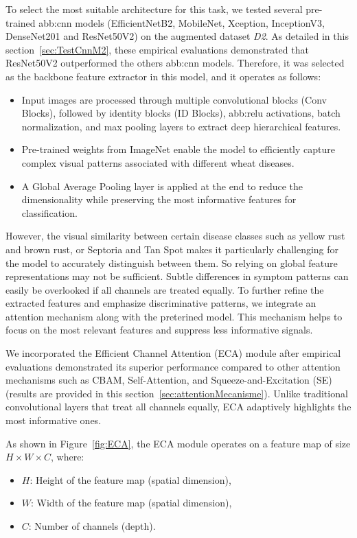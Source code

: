 To select the most suitable architecture for this task, we tested several pre-trained \gls{abb:cnn} models (EfficientNetB2, MobileNet, Xception, InceptionV3, DenseNet201 and ResNet50V2) on the augmented dataset \textit{D2}. As detailed in this section~\ref{sec:TestCnnM2}, these empirical evaluations demonstrated that ResNet50V2 outperformed the others \gls{abb:cnn} models. Therefore, it was selected as the backbone feature extractor in this model, and it operates as follows:
\begin{itemize}
    \item Input images are processed through multiple convolutional blocks (Conv Blocks), followed by identity blocks (ID Blocks), \gls{abb:relu} activations, batch normalization, and max pooling layers to extract deep hierarchical features.
    \item Pre-trained weights from ImageNet enable the model to efficiently capture complex visual patterns associated with different wheat diseases.
    \item A Global Average Pooling layer is applied at the end to reduce the dimensionality while preserving the most informative features for classification.
\end{itemize}

However, the visual similarity between certain disease classes such as yellow rust and brown rust, or Septoria and Tan Spot makes it particularly challenging for the model to accurately distinguish between them. So relying on global feature representations may not be sufficient. Subtle differences in symptom patterns can easily be overlooked if all channels are treated equally. To further refine the extracted features and emphasize discriminative patterns, we integrate an attention mechanism along with the preterined model. This mechanism helps to focus on the most relevant features and suppress less informative signals.


We incorporated the Efficient Channel Attention (ECA) module after empirical evaluations demonstrated its superior performance compared to other attention mechanisms such as CBAM, Self-Attention, and Squeeze-and-Excitation (SE) (results are provided in this section~\ref{sec:attentionMecanisme}). Unlike traditional convolutional layers that treat all channels equally, ECA adaptively highlights the most informative ones.

As shown in Figure~\ref{fig:ECA}, the ECA module operates on a feature map of size \( H \times W \times C \), where:
\begin{itemize}
    \item \( H \): Height of the feature map (spatial dimension),
    \item \( W \): Width of the feature map (spatial dimension),
    \item \( C \): Number of channels (depth).
\end{itemize}

